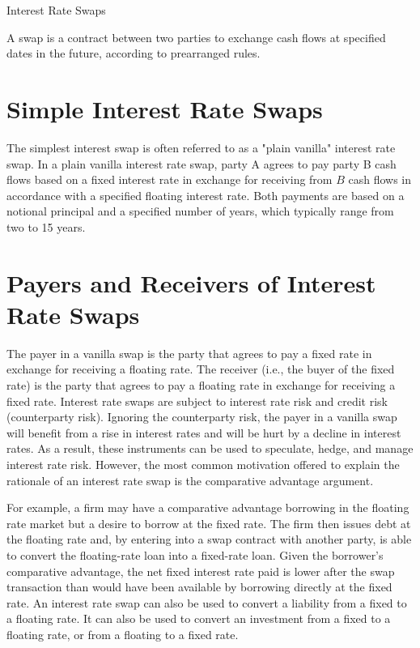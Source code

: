 \documentclass[11pt]{article}
\begin{document}
Interest Rate Swaps

A swap is a contract between two parties to exchange cash flows at specified dates in the future, according to prearranged rules.

\section*{Simple Interest Rate Swaps}
The simplest interest swap is often referred to as a "plain vanilla" interest rate swap. In a plain vanilla interest rate swap, party A agrees to pay party B cash flows based on a fixed interest rate in exchange for receiving from $B$ cash flows in accordance with a specified floating interest rate. Both payments are based on a notional principal and a specified number of years, which typically range from two to 15 years.

\section*{Payers and Receivers of Interest Rate Swaps}
The payer in a vanilla swap is the party that agrees to pay a fixed rate in exchange for receiving a floating rate. The receiver (i.e., the buyer of the fixed rate) is the party that agrees to pay a floating rate in exchange for receiving a fixed rate. Interest rate swaps are subject to interest rate risk and credit risk (counterparty risk). Ignoring the counterparty risk, the payer in a vanilla swap will benefit from a rise in interest rates and will be hurt by a decline in interest rates. As a result, these instruments can be used to speculate, hedge, and manage interest rate risk. However, the most common motivation offered to explain the rationale of an interest rate swap is the comparative advantage argument.

For example, a firm may have a comparative advantage borrowing in the floating rate market but a desire to borrow at the fixed rate. The firm then issues debt at the floating rate and, by entering into a swap contract with another party, is able to convert the floating-rate loan into a fixed-rate loan. Given the borrower's comparative advantage, the net fixed interest rate paid is lower after the swap transaction than would have been available by borrowing directly at the fixed rate. An interest rate swap can also be used to convert a liability from a fixed to a floating rate. It can also be used to convert an investment from a fixed to a floating rate, or from a floating to a fixed rate.
\end{document}

